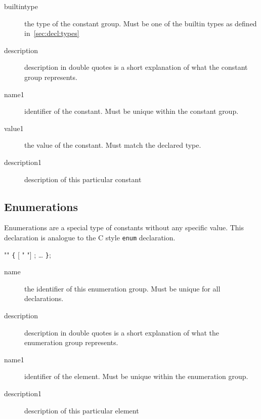 \documentclass[a4paper,11pt,twoside]{report}
\begin{document}
{{\begin{description}
    \item [builtintype] the type of the constant group. Must be one of the 
                        builtin types as defined in~\ref{sec:decl:types}
    
    \item [description] description in double quotes is a short explanation of
                        what the constant group represents.
    
    \item [name1] identifier of the constant. Must be unique within the 
                  constant group. 
    
    \item [value1] the value of the constant. Must match the declared type.
    
    \item [description1] description of this particular constant
    
\end{description}

\subsection{Enumerations}

Enumerations are a special type of constants without any specific value. This
declaration is analogue to the C style \texttt{enum} declaration.

\begin{syntax}
  "" \verb+{+
     [ " "] ;
    \ldots
\verb+}+;
\end{syntax}

\begin{description}
    \item[name] the identifier of this enumeration group. Must be unique for 
                all declarations.
    
    \item [description] description in double quotes is a short explanation of
                        what the enumeration group represents.
    
    \item [name1] identifier of the element. Must be unique within the 
                  enumeration group.   
    
    \item [description1] description of this particular element
    
\end{description}

}}
\end{document}
